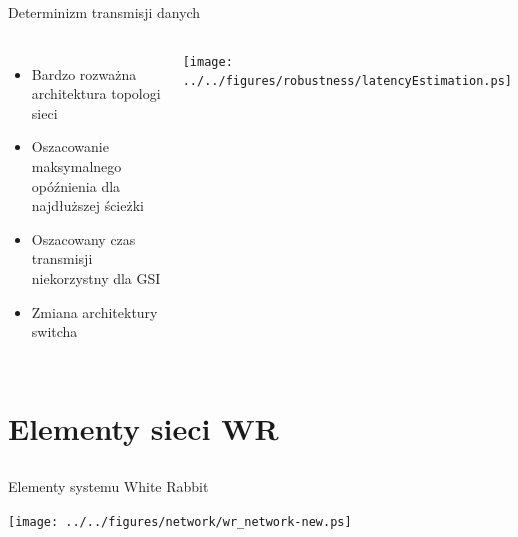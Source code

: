 \documentclass[compress,red]{beamer}
\begin{document}
\begin{frame}{Determinizm transmisji danych}


  \begin{columns}[c]

  

  \begin{itemize}
    \item Bardzo rozważna architektura topologi sieci
    \item Oszacowanie maksymalnego opóźnienia dla najdłuższej ścieżki
    \item Oszacowany czas transmisji niekorzystny dla GSI
    \item Zmiana architektury switcha
  \end{itemize}

  

      \begin{center}
      \texttt{[image: ../../figures/robustness/latencyEstimation.ps]}
      \end{center}

      

  \end{columns}


\end{frame}


\section{Elementy sieci WR}
\subsection{}
\begin{frame}{Elementy systemu White Rabbit}

      \begin{center}
      \texttt{[image: ../../figures/network/wr\_network-new.ps]}
      \end{center}

\end{frame}
\end{document}
